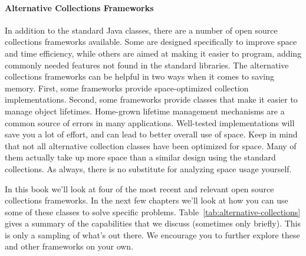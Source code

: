 \paragraph{Alternative Collections Frameworks} In addition to the standard Java
classes, there are a number of open source collections frameworks available. Some are designed
specifically to improve space and time efficiency, while others are aimed at
making it easier to program, adding commonly needed features not
found in the standard libraries. 
The alternative collections frameworks can be helpful in two ways when it comes to saving memory. First,
some frameworks provide space-optimized collection implementations. Second, some frameworks
provide classes that make it easier to manage object lifetimes.
Home-grown lifetime management mechanisms are a common source of errors in many
applications. Well-tested implementations will save you a lot of effort, and
can lead to better overall use of space.
Keep in mind that not all alternative collection classes have
been optimized for space.
Many of them actually take up more space than a similar design using the
standard collections. As always, there is no substitute for analyzing space
usage yourself.

In this book we'll look at four of the most recent and relevant
open source collections frameworks. In the next few chapters we'll look at how
you can use some of these classes to solve specific problems.
Table~\ref{tab:alternative-collections} gives a summary of the capabilities that
we discuss (sometimes only briefly). This is only a sampling of what's out
there. We encourage you to further explore these and other frameworks on your own.

